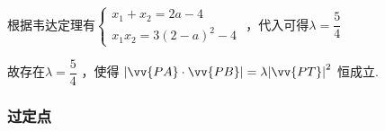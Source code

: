 \begin{enumerate}
\begin{jieda}
\begin{enumerate}
            根据韦达定理有$\left\{\begin{array}{l}
                 {x}_{1} + {x}_{2} =  2a-4  \\
                 {x}_{1}{x}_{2} = 3{\left( 2 - a\right) }^{2} - 4
            \end{array}\right.$ ，代入可得$\lambda  = \dfrac{5}{4}$ 
            
            故存在$\lambda  = \dfrac{5}{4}$ ，使得 $\left| {\vv{PA} \cdot  \vv{PB}}\right|  = \lambda {\left| \vv{PT}\right| }^{2}$ 恒成立.
        \end{enumerate}
    \end{jieda}
\end{enumerate}


\subsubsection*{过定点}
